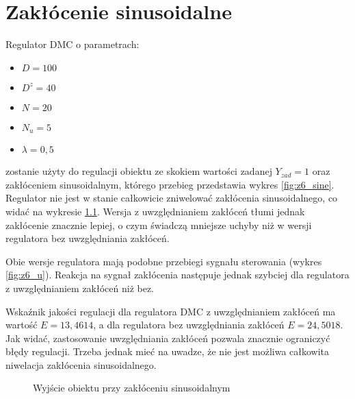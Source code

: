 \chapter{Zakłócenie sinusoidalne}
Regulator DMC o parametrach:
\begin{itemize}
	\item $D=100$
	\item $D^z=40$
	\item $N=20$
	\item $N_u=5$
	\item $\lambda=0,5$
\end{itemize}
zostanie użyty do regulacji obiektu ze skokiem wartości zadanej $Y_{zad}=1$ oraz zakłóceniem sinusoidalnym, którego przebieg przedstawia wykres \ref{fig:z6_sine}. Regulator nie jest w stanie całkowicie zniwelować zakłócenia sinusoidalnego, co widać na wykresie \ref{fig:z6_y}. Wersja z uwzględnianiem zakłóceń tłumi jednak zakłócenie znacznie lepiej, o czym świadczą mniejsze uchyby niż w wersji regulatora bez uwzględniania zakłóceń.

Obie wersje regulatora mają podobne przebiegi sygnału sterowania (wykres \ref{fig:z6_u}). Reakcja na sygnał zakłócenia następuje jednak szybciej dla regulatora z uwzględnianiem zakłóceń niż bez.

Wskaźnik jakości regulacji dla regulatora DMC z uwzględnianiem zakłóceń ma wartość $E=13,4614$, a dla regulatora bez uwzględniania zakłóceń $E=24,5018$. Jak widać, zastosowanie uwzględniania zakłóceń pozwala znacznie ograniczyć błędy regulacji. Trzeba jednak mieć na uwadze, że nie jest możliwa całkowita niwelacja zakłócenia sinusoidalnego.

\begin{figure}[!htb]
	\centering
	\caption{Wyjście obiektu przy zakłóceniu sinusoidalnym}
\label{fig:z6_y}
\end{figure}

